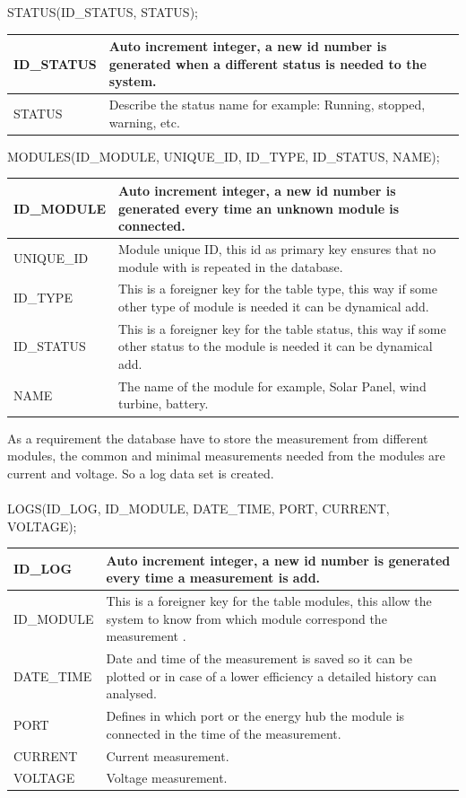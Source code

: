 STATUS(ID\_STATUS, STATUS);

\begin{table}[H]
\centering
	\begin{tabular}{| p{2cm} | p{10cm} |}
		\hline
		ID\_STATUS & Auto increment integer, a new id number is generated when a different status is needed to the system. \\\hline
		STATUS & Describe the status name for example: Running, stopped, warning, etc.\\\hline
	\end{tabular}
\end{table}


MODULES(ID\_MODULE, UNIQUE\_ID, ID\_TYPE, ID\_STATUS, NAME);

\begin{table}[H]
\centering
	\begin{tabular}{| p{2cm} | p{10cm} |}
		\hline
		ID\_MODULE & Auto increment integer, a new id number is generated every time an unknown module is connected. \\\hline
		UNIQUE\_ID & Module unique ID, this id as primary key ensures that no module with is repeated in the database.\\\hline
		ID\_TYPE & This is a foreigner key for the table type, this way if some other type of module is needed it can be dynamical add. \\\hline
		ID\_STATUS & This is a foreigner key for the table status, this way if some other status to the module is needed it can be dynamical add. \\\hline
		NAME & The name of the module for example, Solar Panel, wind turbine, battery. \\\hline
	\end{tabular}
\end{table}
As a requirement the database have to store the measurement  from different modules, the common and minimal measurements needed from the modules are current and voltage. So a log data set is created.
\\\\
LOGS(ID\_LOG, ID\_MODULE, DATE\_TIME, PORT, CURRENT, VOLTAGE);

\begin{table}[H]
\centering
	\begin{tabular}{| p{2cm} | p{10cm} |}
		\hline
		ID\_LOG & Auto increment integer, a new id number is generated every time a measurement is add. \\\hline
		ID\_MODULE & This is a foreigner key for the table modules, this allow the system to know from which module correspond the measurement .\\\hline
		DATE\_TIME & Date and time of the measurement is saved so it can be plotted or in case of a lower efficiency a detailed history can analysed. \\\hline
		PORT & Defines in which port or the energy hub the module is connected in the time of the measurement. \\\hline
		CURRENT & Current measurement. \\\hline
		VOLTAGE & Voltage measurement. \\\hline
	\end{tabular}
\end{table}

